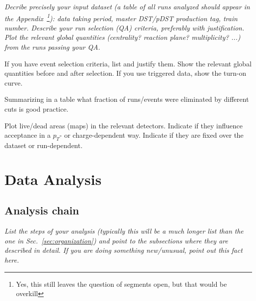 \documentclass[12pt]{article}
\begin{document}
{\it
  Decribe precisely your input dataset (a table of all runs analyzed
  should appear in the Appendix~\footnote{Yes, this still leaves the
  question of segments open, but that would be overkill}): 
  data taking period, master DST/pDST production tag, train number.
  Describe your run selection (QA) criteria, preferably with 
  justification.  Plot the relevant global quantities (centrality?
  reaction plane? multiplicity? ...) from the runs passing your QA.

  If you have event selection criteria, list and justify them.  Show
  the relevant global quantities before and after selection.  If you
  use triggered data, show the turn-on curve.

  Summarizing in a table what fraction of runs/events were eliminated
  by different cuts is good practice.

  Plot live/dead areas (maps) in the relevant detectors.  Indicate if
  they influence acceptance in a $p_T$- or charge-dependent way.
  Indicate if they are fixed over the dataset or run-dependent.

}

\section{Data Analysis}




\subsection{Analysis chain}

{\it
  List the steps of your analysis (typically this will be a much
  longer list than the one in Sec.~\ref{sec:organization}) and
  point to the subsections where they are described in detail.  If you
  are doing something new/unusual, point out this fact here.
}
\end{document}
